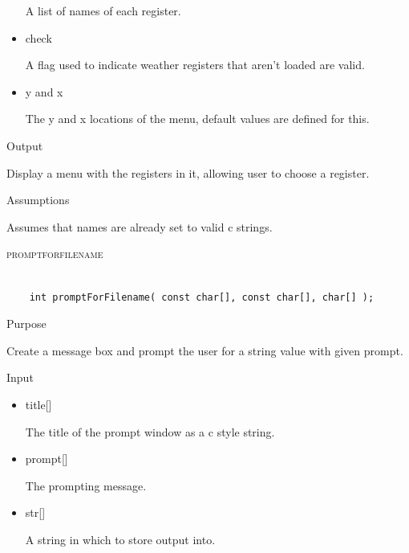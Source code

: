 \documentclass[pdftex, 11pt]{article}
\begin{document}
\begin{description}
\begin{description}
\begin{itemize}
						A list of names of each register.

					\item{check}

						A flag used to indicate weather registers that aren't loaded are valid.

					\item{y and x}

						The y and x locations of the menu, default values are defined for this.

				\end{itemize}

			\item{Output}
				
				Display a menu with the registers in it, allowing user to
				choose a register.

			\item{Assumptions}

				Assumes that names are already set to valid c strings.

		\end{description}



	\item{\textsc{promptforfilename}}

		\begin{lstlisting}

	int promptForFilename( const char[], const char[], char[] );
		\end{lstlisting}

		\begin{description}
			\item{Purpose}

				Create a message box and prompt the user for a string value with given prompt.

			\item{Input}

				\begin{itemize}

					\item{title[]}

						The title of the prompt window as a c style string.

					\item{prompt[]}

						The prompting message.

					\item{str[]}

						A string in which to store output into.


\end{itemize}
\end{description}
\end{description}
\end{document}

